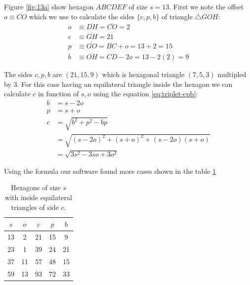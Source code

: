 \documentclass[11pt]{article}
\begin{document}
Figure \ref{fig:13a} show hexagon $ABCDEF$ of size $s = 13$. First we note the offset $o \equiv \overline{CO}$ which we use to calculate the sides $\{c,p,b\}$ of triangle $\triangle{GOH}$:
\begin{align}
o &\equiv \overline{DH} = \overline{CO} = 2 \nonumber\\
c &\equiv \overline{GH} = 21 \nonumber\\
p &\equiv \overline{GO} = \overline{BC} + o = 13+2 = 15 \nonumber\\
b &\equiv \overline{OH} = \overline{CD} - 2o = 13 - 2(2) = 9
\end{align}

The sides $c,p,b$ are $(21,15,9)$ which is hexagonal triangle $(7,5,3)$ multipled by $3$. For this case having an equilateral triangle inside the hexagon we can calculate $c$ in function of $s,o$ using the equation \ref{eq:triplet-cpb}:
\begin{align}
b &= s - 2o \nonumber\\
p &= s + o \nonumber\\
c &= \sqrt{b^2 + p^2 - bp} \nonumber\\
   &= \sqrt{(s - 2o)^2 + (s+o)^2 + (s - 2o)(s+o)} \nonumber\\
   &= \sqrt{3s^2 - 3so + 3o^2}
\end{align}

Using the formula our software found more cases shown in the table \ref{tbl:eqtriangles}
\begin{table}[H]
\begin{center}
\begin{tabular}{| c c | c c c |} 
 \hline
 $s$ & $o$ & $c$ & $p$ & $b$ \\ [0.5ex] 
 \hline\hline
  13 &  2 &  21 &  15 &  9 \\ \hline
  23 &  1 &  39 &  24 & 21 \\ \hline
  37 & 11 &  57 &  48 & 15 \\ \hline
  59 & 13 &  93 &  72 & 33 \\ \hline
\end{tabular}
\caption{Hexagons of size $s$ with inside equilateral triangles of side $c$.}
\label{tbl:eqtriangles}
\end{center}
\end{table}
\end{document}
